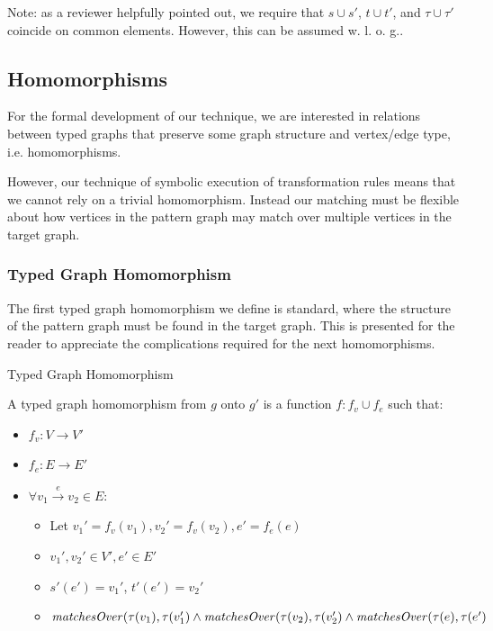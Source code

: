 Note: as a reviewer helpfully pointed out, we require that $s \cup s'$, $t \cup t'$, and $\tau \cup \tau'$ coincide on common elements. However, this can be assumed w. l. o. g..



\subsection{Homomorphisms}
\label{subsec:homomorphisms}

For the formal development of our technique, we are interested in relations between typed graphs that preserve some graph structure and vertex/edge type, i.e. homomorphisms.

However, our technique of symbolic execution of transformation rules means that we cannot rely on a trivial homomorphism. Instead our matching must be flexible about how vertices in the pattern graph may match over multiple vertices in the target graph.

\subsubsection*{Typed Graph Homomorphism}

The first typed graph homomorphism we define is standard, where the structure of the pattern graph must be found in the target graph. This is presented for the reader to appreciate the complications required for the next homomorphisms.

\begin{definition}{Typed Graph Homomorphism\\}
\label{def:typed_graph_homomorphism}

A typed graph homomorphism from $g$ onto $g'$ is a function $f: f_v \cup f_e$ such that:
\begin{itemize}
\item $f_v: V\rightarrow V'$
\item $f_e: E\rightarrow E'$
\item $\forall v_1 \xrightarrow{e} v_2\in E$:
\begin{itemize}
\item Let $ v_1' = f_v(v_1), v_2' = f_v(v_2), e' = f_e(e)$
\item $v_1', v_2' \in V', e' \in E'$
\item $s'(e') = v_1'$, $t'(e') = v_2'$
\item $\mathit{matchesOver}(\tau(v_1), \tau(v_1') \land \\\mathit{matchesOver}(\tau(v_2), \tau(v_2') \land\\ \mathit{matchesOver}(\tau(e), \tau(e')$
\end{itemize}

\end{itemize}  
\end{definition}

